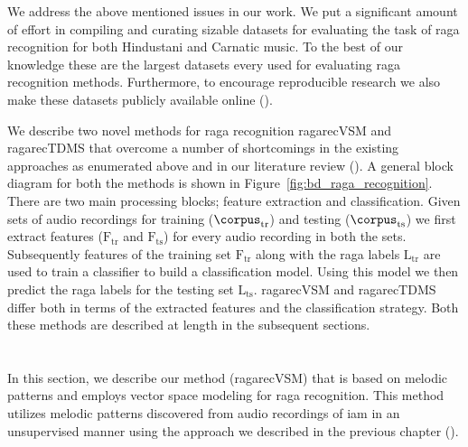 We address the above mentioned issues in our work. We put a significant amount of effort in compiling and curating sizable datasets for evaluating the task of \gls{raga} recognition for both Hindustani and Carnatic music. To the best of our knowledge these are the largest datasets every used for evaluating \gls{raga} recognition methods. Furthermore, to encourage reproducible research we also make these datasets publicly available online (). 

We describe two novel methods for \gls{raga} recognition \acrshort{ragarecVSM} and \acrshort{ragarecTDMS} that overcome a number of shortcomings in the existing approaches as enumerated above and in our literature review (). A general block diagram for both the methods is shown in Figure~\ref{fig:bd_raga_recognition}. There are two main processing blocks; feature extraction and classification. Given sets of audio recordings for training ($\mathrm{\corpus}_\mathrm{tr}$) and testing ($\mathrm{\corpus}_\mathrm{ts}$) we first extract features ($\mathrm{F}_\mathrm{tr}$ and $\mathrm{F}_\mathrm{ts}$) for every audio recording in both the sets. Subsequently features of the training set $\mathrm{F}_\mathrm{tr}$ along with the \gls{raga} labels $\mathrm{L}_\mathrm{tr}$ are used to train a classifier to build a classification model. Using this model we then predict the \gls{raga} labels for the testing set $\mathrm{L}_\mathrm{ts}$. \acrshort{ragarecVSM} and \acrshort{ragarecTDMS} differ both in terms of the extracted features and the classification strategy. Both these methods are described at length in the subsequent sections.



\section{}
\label{sec:phrase_based_feature_extraction}

In this section, we describe our method (\acrshort{ragarecVSM}) that is based on melodic patterns and employs vector space modeling for \gls{raga} recognition. This method utilizes melodic patterns discovered from audio recordings of \gls{iam} in an unsupervised manner using the approach we described in the previous chapter (\chapref{}). 

